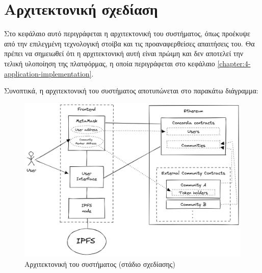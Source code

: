 \section{Αρχιτεκτονική σχεδίαση} \label{section:3-7-architecture-design}

Στο κεφάλαιο αυτό περιγράφεται η αρχιτεκτονική του συστήματος, όπως προέκυψε από την επιλεγμένη τεχνολογική στοίβα και τις προαναφερθείσες απαιτήσεις του. Θα πρέπει να σημειωθεί ότι η αρχιτεκτονική αυτή είναι πρώιμη και δεν αποτελεί την τελική υλοποίηση της πλατφόρμας, η οποία περιγράφεται στο κεφάλαιο \ref{chapter:4-application-implementation}. 

Συνοπτικά, η αρχιτεκτονική του συστήματος αποτυπώνεται στο παρακάτω διάγραμμα:

\begin{figure}[H]
    \centering
    \includegraphics[width=.75\textwidth]{assets/figures/chapter-3/3.7.architecture-design}
    \caption{Αρχιτεκτονική του συστήματος (στάδιο σχεδίασης)}
\end{figure}

